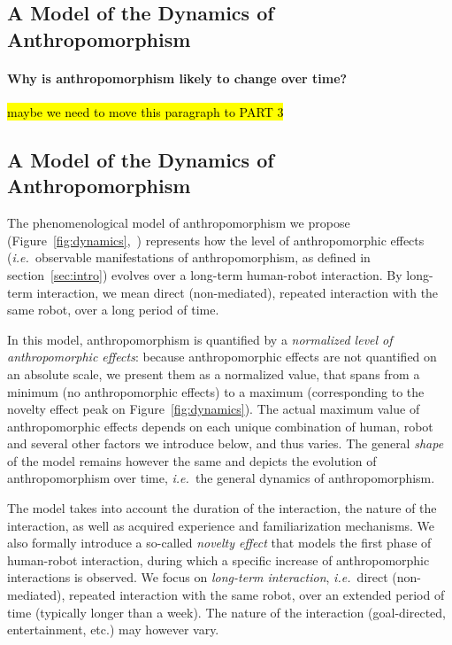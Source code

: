 \documentclass{frontiersSCNS} %
\newcommand{\ie}{{\textit{i.e.~}}}
\begin{document}
\subsection{A Model of the Dynamics of Anthropomorphism}
\label{sec:dynamics-model}

\paragraph{Why is anthropomorphism likely to change over time?}
\hl{maybe we need to move this paragraph to PART 3}


\subsection{A Model of the Dynamics of Anthropomorphism}

The phenomenological model of anthropomorphism we propose
(Figure~\ref{fig:dynamics},~\cite{lemaignan2014dynamics}) represents how the
level of anthropomorphic effects (\ie observable manifestations of
anthropomorphism, as defined in section~\ref{sec:intro}) evolves over a
long-term human-robot interaction. By long-term interaction, we mean direct
(non-mediated), repeated interaction with the same robot, over a long period of
time. 

In this model, anthropomorphism is quantified by a \emph{normalized level of
anthropomorphic effects}: because anthropomorphic effects are not quantified on
an absolute scale, we present them as a normalized value, that spans from a
minimum (no anthropomorphic effects) to a maximum (corresponding to the novelty
effect peak on Figure~\ref{fig:dynamics}). The actual maximum value of
anthropomorphic effects depends on each unique combination of human, robot and
several other factors we introduce below, and thus varies. The general
\emph{shape} of the model remains however the same and depicts the evolution of
anthropomorphism over time, \ie the general dynamics of anthropomorphism.

The model takes into account the duration of the interaction, the nature of the
interaction, as well as acquired experience and familiarization mechanisms. We
also formally introduce a so-called \emph{novelty effect} that models the first
phase of human-robot interaction, during which a specific increase of
anthropomorphic interactions is observed. We focus on \emph{long-term
interaction}, \ie direct (non-mediated), repeated interaction with the same
robot, over an extended period of time (typically longer than a week). The nature 
of the interaction (goal-directed, entertainment, etc.) may
however vary.
\end{document}
